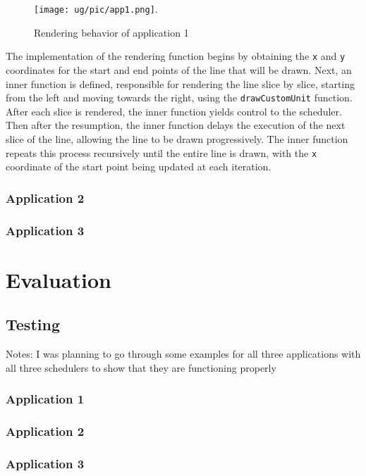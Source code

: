 \documentclass[logo,bsc,singlespacing,parskip]{infthesis}
\begin{document}
\begin{figure}[htbp]
    \centering
    \texttt{[image: ug/pic/app1.png]}.
    \caption{Rendering behavior of application 1}
    \label{fig:app1}
\end{figure}

The implementation of the rendering function begins by obtaining the \texttt{x} and \texttt{y} coordinates for the start and end points of the line that will be drawn. Next, an inner function is defined, responsible for rendering the line slice by slice, starting from the left and moving towards the right, using the \texttt{drawCustomUnit} function. After each slice is rendered, the inner function yields control to the scheduler. Then after the resumption, the inner function delays the execution of the next slice of the line, allowing the line to be drawn progressively. The inner function repeats this process recursively until the entire line is drawn, with the \texttt{x} coordinate of the start point being updated at each iteration.

\subsection{Application 2}
\subsection{Application 3}

\chapter{Evaluation}
\label{chap:evaluation}

\section{Testing}
Notes: I was planning to go through some examples for all three applications with all three schedulers to show that they are functioning properly

\subsection{Application 1}

\subsection{Application 2}

\subsection{Application 3}
\end{document}
